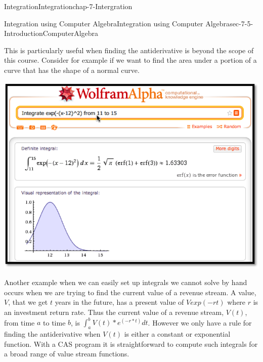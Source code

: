 \documentclass[oneside,10pt,]{book}
\numberwithin{equation}{section}
\begin{document}
\begin{chapterptx}{Integration}{}{Integration}{}{}{chap-7-Intergration}
\begin{sectionptx}{Integration using Computer Algebra}{}{Integration using Computer Algebra}{}{}{sec-7-5-IntroductionComputerAlgebra}
\begin{sidebyside}{1}{0.05}{0.05}{0}
\begin{sbspanel}{0.9}
\end{sbspanel}%
\end{sidebyside}%
\par
\hypertarget{p-2893}{}%
This is particularly useful when finding the antiderivative is beyond the scope of this course.  Consider for example if we want to find the area under a portion of a curve that has the shape of a normal curve.%
\begin{sidebyside}{1}{0.05}{0.05}{0}%
\begin{sbspanel}{0.9}%
\includegraphics[width=1\linewidth]{images/sec7-5-12.png}
\end{sbspanel}%
\end{sidebyside}%
\par
\hypertarget{p-2894}{}%
Another example when we can easily set up integrals we cannot solve by hand occurs when we are trying to find the current value of a revenue stream.  A value, \(V\), that we get \(t\) years in the future, has a present value of \(V exp(-r t)\) where \(r\) is an investment return rate.  Thus the current value of a revenue stream, \(V(t)\), from time \(a\) to time \(b\), is \(\int_a^b V(t)*e^{(-r*t)} dt\).  However we only have a rule for finding the antiderivative when \(V(t)\) is either a constant or exponential function.  With a CAS program it is straightforward to compute such integrals for a broad range of value stream functions.%
\begin{sidebyside}{1}{0.1}{0.1}{0}%
\begin{sbspanel}{0.8}%

\end{sbspanel}
\end{sidebyside}
\end{sectionptx}
\end{chapterptx}
\end{document}
